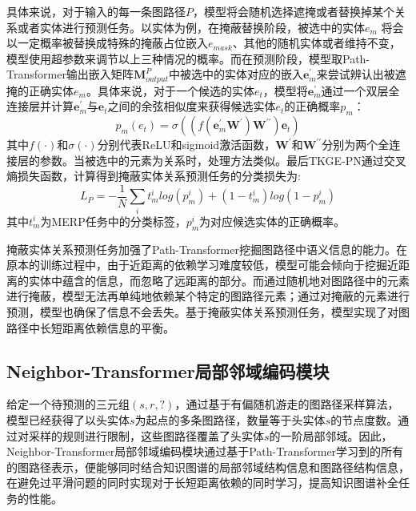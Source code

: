 具体来说，对于输入的每一条图路径$P$，模型将会随机选择遮掩或者替换掉某个关系或者实体进行预测任务。以实体为例，在掩蔽替换阶段，被选中的实体$e_m$ 将会以一定概率被替换成特殊的掩蔽占位嵌入$e_{mask}$、其他的随机实体或者维持不变，模型使用超参数来调节以上三种情况的概率。而在预测阶段，模型取Path-Transformer输出嵌入矩阵$\mathbf{M}_{output}^{P}$中被选中的实体对应的嵌入$\boldsymbol{e}_{m}^\prime$来尝试辨认出被遮掩的正确实体$e_m$。具体来说，对于一个候选的实体$e_t$，模型将$\boldsymbol{e}_{m}^\prime$通过一个双层全连接层并计算$\boldsymbol{e}_{m}^\prime$与$\boldsymbol{e}_{t}$之间的余弦相似度来获得候选实体$e_t$的正确概率$p_m$：
\begin{equation}
  p_m(e_t)=\sigma((f(\boldsymbol{e}_m^\prime\mathbf{W}^{\prime})\mathbf{W}^{\prime\prime})\boldsymbol{e}_t)
\end{equation}
其中$f (\cdot)$和$\sigma(\cdot)$分别代表ReLU和sigmoid激活函数，$\mathbf{W}^{\prime}$和$\mathbf{W}^{\prime\prime}$分别为两个全连接层的参数。当被选中的元素为关系时，处理方法类似。最后TKGE-PN通过交叉熵损失函数，计算得到掩蔽实体关系预测任务的分类损失为:
\begin{equation}
  L_{P} = -\frac{1}{N}\sum\limits_{i}t_m^ilog(p_m^i)+(1-t_m^i)log(1-p_m^i)
\end{equation}
其中$t_m^i$为MERP任务中的分类标签，$p_m^i$为对应候选实体的正确概率。

掩蔽实体关系预测任务加强了Path-Transformer挖掘图路径中语义信息的能力。在原本的训练过程中，由于近距离的依赖学习难度较低，模型可能会倾向于挖掘近距离的实体中蕴含的信息，而忽略了远距离的部分。而通过随机地对图路径中的元素进行掩蔽，模型无法再单纯地依赖某个特定的图路径元素；通过对掩蔽的元素进行预测，模型也确保了信息不会丢失。基于掩蔽实体关系预测任务，模型实现了对图路径中长短距离依赖信息的平衡。

\subsection{Neighbor-Transformer局部邻域编码模块}

给定一个待预测的三元组$(s,r,?)$，通过基于有偏随机游走的图路径采样算法，模型已经获得了以头实体$s$为起点的多条图路径，数量等于头实体$s$的节点度数。通过对采样的规则进行限制，这些图路径覆盖了头实体$s$的一阶局部邻域。因此，Neighbor-Transformer局部邻域编码模块通过基于Path-Transformer学习到的所有的图路径表示，便能够同时结合知识图谱的局部邻域结构信息和图路径结构信息，在避免过平滑问题的同时实现对于长短距离依赖的同时学习，提高知识图谱补全任务的性能。

